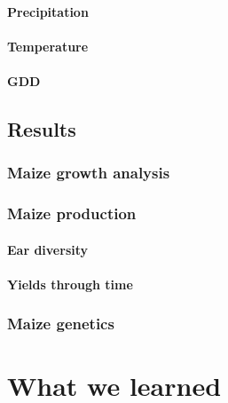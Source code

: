 \documentclass[12pt,]{krantz}
\theoremstyle{definition}
\theoremstyle{definition}
\theoremstyle{definition}
\theoremstyle{remark}
\begin{document}
\hypertarget{precipitation}{%
\subsubsection{Precipitation}\label{precipitation}}

\hypertarget{temperature}{%
\subsubsection{Temperature}\label{temperature}}

\hypertarget{gdd}{%
\subsubsection{GDD}\label{gdd}}

\hypertarget{results}{%
\section{Results}\label{results}}

\hypertarget{maize-growth-analysis}{%
\subsection*{Maize growth analysis}\label{maize-growth-analysis}}


\hypertarget{maize-production}{%
\subsection*{Maize production}\label{maize-production}}


\hypertarget{ear-diversity}{%
\subsubsection{Ear diversity}\label{ear-diversity}}

\hypertarget{yields-through-time}{%
\subsubsection{Yields through time}\label{yields-through-time}}

\hypertarget{maize-genetics}{%
\subsection*{Maize genetics}\label{maize-genetics}}


\hypertarget{what-we-learned}{%
\chapter{What we learned}\label{what-we-learned}}
\end{document}
